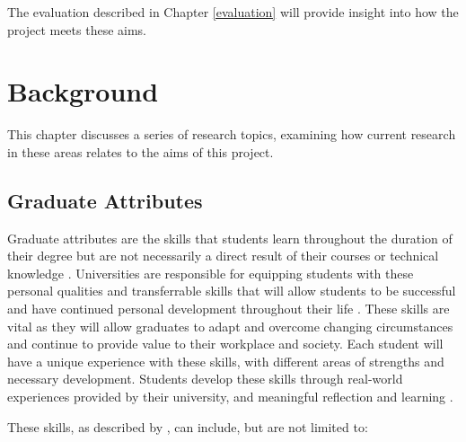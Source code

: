 \documentclass{l4proj}
\begin{document}
The evaluation described in Chapter \ref{evaluation} will provide insight into how the project meets these aims.


\chapter{Background} \label{Background}

This chapter discusses a series of research topics, examining how current research in these areas relates to the aims of this project.

\section{Graduate Attributes} \label{backgroundGraduateAttributes}

Graduate attributes are the skills that students learn throughout the duration of their degree but are not necessarily a direct result of their courses or technical knowledge \citep{glasgow_university_attributes}. Universities are responsible for equipping students with these personal qualities and transferrable skills that will allow students to be successful and have continued personal development throughout their life \citep{stirling_graduate_nodate}. These skills are vital as they will allow graduates to adapt and overcome changing circumstances and continue to provide value to their workplace and society. Each student will have a unique experience with these skills, with different areas of strengths and necessary development. Students develop these skills through real-world experiences provided by their university, and meaningful reflection and learning \citep{edinburgh_definition_skills}.

These skills, as described by \citet{litchfield_contextualising_2010, stevens_industry_2016, bruno_reflective_2018}, can include, but are not limited to:
\end{document}
